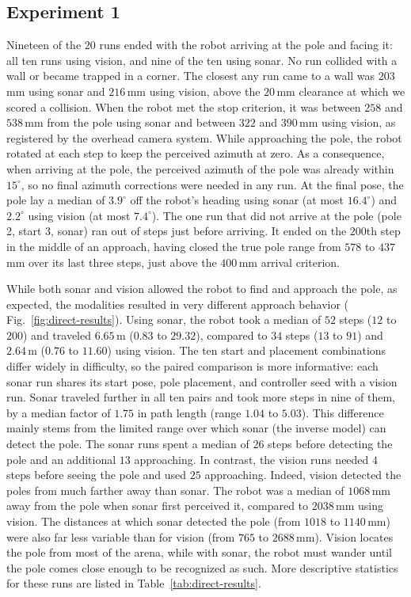 \documentclass[11pt]{article}
\begin{document}
\subsection{Experiment 1}

Nineteen of the $20$ runs ended with the robot arriving at the pole and facing it: all ten runs using vision, and nine of the ten using sonar. No run collided with a wall or became trapped in a corner. The closest any run came to a wall was $203$\,mm using sonar and $216$\,mm using vision, above the $20$\,mm clearance at which we scored a collision. When the robot met the stop criterion, it was between $258$ and $538$\,mm from the pole using sonar and between $322$ and $390$\,mm using vision, as registered by the overhead camera system. While approaching the pole, the robot rotated at each step to keep the perceived azimuth at zero. As a consequence, when arriving at the pole, the perceived azimuth of the pole was already within $15^{\circ}$, so no final azimuth corrections were needed in any run. At the final pose, the pole lay a median of $3.9^{\circ}$ off the robot's heading using sonar (at most $16.4^{\circ}$) and $2.2^{\circ}$ using vision (at most $7.4^{\circ}$). The one run that did not arrive at the pole (pole 2, start 3, sonar) ran out of steps just before arriving. It ended on the $200$th step in the middle of an approach, having closed the true pole range from $578$ to $437$\,mm over its last three steps, just above the $400$\,mm arrival criterion.

While both sonar and vision allowed the robot to find and approach the pole, as expected, the modalities resulted in very different approach behavior ( Fig.~\ref{fig:direct-results}). Using sonar, the robot took a median of $52$ steps ($12$ to $200$) and traveled $6.65$\,m ($0.83$ to $29.32$), compared to $34$ steps ($13$ to $91$) and $2.64$\,m ($0.76$ to $11.60$) using vision. The ten start and placement combinations differ widely in difficulty, so the paired comparison is more informative: each sonar run shares its start pose, pole placement, and controller seed with a vision run. Sonar traveled further in all ten pairs and took more steps in nine of them, by a median factor of $1.75$ in path length (range $1.04$ to $5.03$). This difference mainly stems from the limited range over which sonar (the inverse model) can detect the pole. The sonar runs spent a median of $26$ steps before detecting the pole and an additional $13$ approaching. In contrast, the vision runs needed $4$ steps before seeing the pole and used $25$ approaching. Indeed, vision detected the poles from much farther away than sonar. The robot was a median of $1068$\,mm away from the pole when sonar first perceived it, compared to $2038$\,mm using vision. The distances at which sonar detected the pole (from $1018$ to $1140$\,mm) were also far less variable than for vision (from $765$ to $2688$\,mm). Vision locates the pole from most of the arena, while with sonar, the robot must wander until the pole comes close enough to be recognized as such. More descriptive statistics for these runs are listed in Table~\ref{tab:direct-results}.
\end{document}
